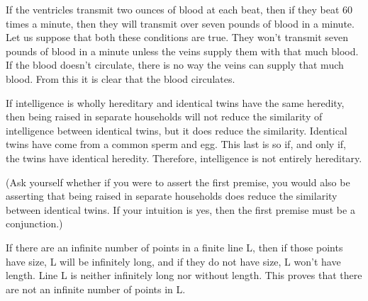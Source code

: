 \begin{enumerate}
\begin{statement}
    {If the ventricles transmit two ounces of blood at each beat, then if they
    beat 60 times a minute, then they will transmit over seven pounds of blood
    in a minute. Let us suppose that both these conditions are true. They won't
    transmit seven pounds of blood in a minute unless the veins supply them with
    that much blood. If the blood doesn't circulate, there is no way the veins
    can supply that much blood. From this it is clear that the blood circulates.
    }
\end{statement}

\begin{statement}{If intelligence is wholly hereditary and identical twins have
    the same heredity, then being raised in separate households will not reduce
    the similarity of intelligence between identical twins, but it does reduce
    the similarity. Identical twins have come from a common sperm and egg. This
    last is so if, and only if, the twins have identical heredity. Therefore,
    intelligence is not entirely hereditary.

(Ask yourself whether if you were to assert the first premise, you would also be
asserting that being raised in separate households does reduce the similarity
between identical twins. If your intuition is yes, then the first premise must
    be a conjunction.)}

\end{statement}

\begin{statement}{If there are an infinite number of points in a finite line L,
    then if those points have size, L will be infinitely long, and if they do
    not have size, L won't have length. Line L is neither infinitely long nor
    without length. This proves that there are not an infinite number of points
    in L.}
\end{statement}


\end{enumerate}
